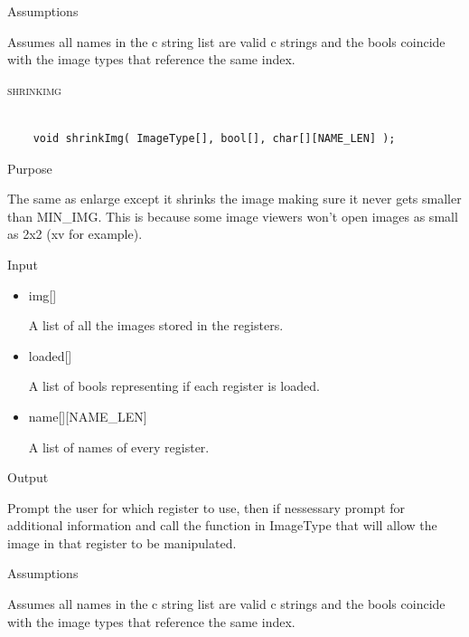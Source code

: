 \documentclass[pdftex, 11pt]{article}
\begin{document}
\begin{description}
\begin{description}
			\item{Assumptions}

				Assumes all names in the c string list are valid c
				strings and the bools coincide with the image types that
				reference the same index.

		\end{description}



	\item{\textsc{shrinkimg}}

		\begin{lstlisting}

	void shrinkImg( ImageType[], bool[], char[][NAME_LEN] );
		\end{lstlisting}

		\begin{description}
			\item{Purpose}

				The same as enlarge except it shrinks the image making sure it never gets
				smaller than MIN\_IMG.  This is because some image viewers won't open images
				as small as 2x2 (xv for example).

			\item{Input}

				\begin{itemize}

					\item{img[]}

						A list of all the images stored in the registers.

					\item{loaded[]}

						A list of bools representing if each register is loaded.

					\item{name[][NAME\_LEN]}

						A list of names of every register.

				\end{itemize}

			\item{Output}

				Prompt the user for which register to use, then if nessessary
				prompt for additional information and call the function
				in ImageType that will allow the image in that register to
				be manipulated.

			\item{Assumptions}

				Assumes all names in the c string list are valid c
				strings and the bools coincide with the image types that
				reference the same index.


\end{description}
\end{description}
\end{document}
